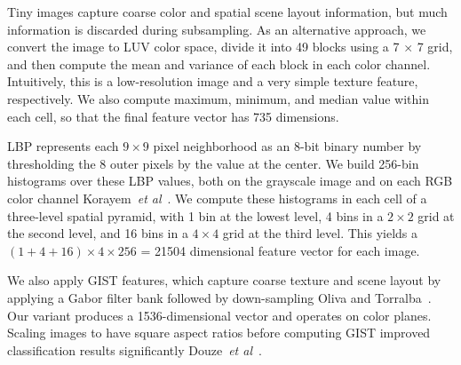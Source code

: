  Tiny images capture coarse color and spatial
scene layout information, but much information is discarded during
subsampling.  As an alternative approach, we convert the image to LUV
color space, divide it into 49 blocks using a 7 $\times$ 7 grid, and
then compute the mean and variance of each block in each color
channel.  Intuitively, this is a low-resolution image and a very
simple texture feature, respectively.  We also compute maximum,
minimum, and median value within each cell, so that the final
feature vector has 735 dimensions.




 LBP represents each $9 \times 9$ pixel neighborhood 
as an 8-bit binary number by thresholding the 8 outer pixels
by the value at the center.  We build 256-bin histograms over
these LBP values, both on the grayscale image and on each RGB color
channel Korayem~\textit{et al}~\cite{korayem2012solving}. We compute these histograms in each cell of a three-level spatial
pyramid, with 1 bin at the lowest level, 4 bins in a $2 \times 2$ grid
at the second level, and 16 bins in a $4 \times 4$ grid at the third level.
This yields a $(1+4+16) \times 4 \times 256$ = 21504 dimensional feature
vector for each image.

 We also apply GIST features, which capture coarse texture
and scene layout by applying a Gabor filter bank followed by
down-sampling Oliva and Torralba~\cite{oliva2001modeling}. Our variant produces a
1536-dimensional  vector and operates on color planes. Scaling
images to have square aspect ratios before computing GIST improved
classification results significantly Douze~\textit{et al}~\cite{douze2009evaluation}.



